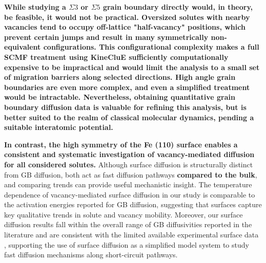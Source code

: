 \documentclass[preprint,12pt]{elsarticle}
\providecommand{\DIFaddtex}[1]{{\bf #1}} %
\providecommand{\DIFdeltex}[1]{} %
\providecommand{\DIFaddbegin}{\protect\color{blue}} %
\providecommand{\DIFaddend}{\protect\color{black}} %
\providecommand{\DIFdelbegin}{\protect\color{red}} %
\providecommand{\DIFdelend}{\protect\color{black}} %
\providecommand{\DIFadd}[1]{\texorpdfstring{\DIFaddtex{#1}}{#1}} %
\providecommand{\DIFdel}[1]{\texorpdfstring{\DIFdeltex{#1}}{}} %
\newcommand{\DIFscaledelfig}{0.5}
\newlength{\DIFdelgraphicswidth} %
\newlength{\DIFdelgraphicsheight} %
\newcommand{\DIFaddincludegraphics}[2][]{{\color{blue}\fbox{\DIFOincludegraphics[#1]{#2}}}} %
\newcommand{\DIFdelincludegraphics}[2][]{%
\sbox{\DIFdelgraphicsbox}{\DIFOincludegraphics[#1]{#2}}%
\settoboxwidth{\DIFdelgraphicswidth}{\DIFdelgraphicsbox} %
\settoboxtotalheight{\DIFdelgraphicsheight}{\DIFdelgraphicsbox} %
\scalebox{\DIFscaledelfig}{%
\parbox[b]{\DIFdelgraphicswidth}{\usebox{\DIFdelgraphicsbox}\\[-\baselineskip] \rule{\DIFdelgraphicswidth}{0em}}\llap{\resizebox{\DIFdelgraphicswidth}{\DIFdelgraphicsheight}{%
\setlength{\unitlength}{\DIFdelgraphicswidth}%
\begin{picture}(1,1)%
\thicklines\linethickness{2pt} %
{\color[rgb]{1,0,0}\put(0,0){\framebox(1,1){}}}%
{\color[rgb]{1,0,0}\put(0,0){\line( 1,1){1}}}%
{\color[rgb]{1,0,0}\put(0,1){\line(1,-1){1}}}%
\end{picture}%
}\hspace*{3pt}}} %
} %
\DeclareRobustCommand{\DIFaddbegin}{\DIFOaddbegin \let\includegraphics\DIFaddincludegraphics} %
\DeclareRobustCommand{\DIFaddend}{\DIFOaddend \let\includegraphics\DIFOincludegraphics} %
\DeclareRobustCommand{\DIFdelbegin}{\DIFOdelbegin \let\includegraphics\DIFdelincludegraphics} %
\DeclareRobustCommand{\DIFdelend}{\DIFOaddend \let\includegraphics\DIFOincludegraphics} %
\begin{document}
\DIFaddbegin \DIFadd{While studying a $\Sigma3$ or $\Sigma5$ grain boundary directly would, in theory, be feasible, it would not be practical. Oversized solutes with nearby vacancies tend to occupy off-lattice "half-vacancy" positions, which prevent certain jumps and result in many symmetrically non-equivalent configurations. This configurational complexity makes a full SCMF treatment using KineCluE sufficiently computationally expensive to be impractical and would limit the analysis to a small set of migration barriers along selected directions. High angle grain boundaries are even more complex, and even a simplified treatment would be intractable.  Nevertheless, obtaining quantitative grain boundary diffusion data is valuable for refining this analysis, but is better suited to the realm of classical molecular dynamics, pending a suitable interatomic potential. 
}

\DIFadd{In contrast, the high symmetry of the Fe (110) surface enables a consistent and systematic investigation of vacancy-mediated diffusion for all considered solutes. }\DIFaddend Although surface diffusion is structurally distinct from GB diffusion, both act as fast diffusion pathways \DIFaddbegin \DIFadd{compared to the bulk}\DIFaddend , and comparing trends can provide useful mechanistic insight. The temperature dependence of vacancy-mediated surface diffusion in our study is comparable to the activation energies reported for GB diffusion, suggesting that surfaces capture key qualitative trends in solute and vacancy mobility. Moreover, our surface diffusion results fall within the overall range of GB diffusivities reported in the literature and are consistent with the limited available experimental surface data \cite{taylor2024directly}, supporting the use of surface diffusion as a simplified model system to study fast diffusion mechanisms along short-circuit pathways. 
\DIFdelbegin \DIFdel{Quantitative predictions for specific GB types would require direct GB simulations, which are left for future work.
}%


\DIFdelend 
\end{document}
